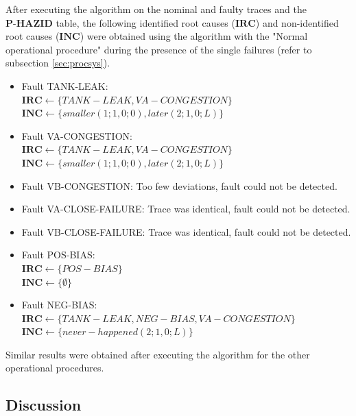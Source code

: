 \documentclass[conference]{IEEEtran}
\begin{document}
After executing the algorithm on the nominal and faulty traces and the $\textbf{P-HAZID}$ table, the following identified root causes ($\mathbf{IRC}$) and non-identified root causes ($\mathbf{INC}$) were obtained using the algorithm with the "Normal operational procedure" during the presence of the single failures (refer to subsection \ref{sec:procsys}).

\begin{itemize}

\item Fault TANK-LEAK: \\ $\mathbf{IRC} \leftarrow \{ TANK-LEAK,VA-CONGESTION \} $\\ $\mathbf{INC} \leftarrow \{ smaller(1;1,0;0), later(2;1,0;L) \}$

\item Fault VA-CONGESTION: \\ $\mathbf{IRC} \leftarrow \{ TANK-LEAK,VA-CONGESTION \}$\\ $\mathbf{INC} \leftarrow \{ smaller(1;1,0;0), later(2;1,0;L) \}$

\item Fault VB-CONGESTION: Too few deviations, fault could not be detected.

\item Fault VA-CLOSE-FAILURE: Trace was identical, fault could not be detected.

\item Fault VB-CLOSE-FAILURE: Trace was identical, fault could not be detected.

\item Fault POS-BIAS: \\ $\mathbf{IRC} \leftarrow \{ POS-BIAS \}$ \\ $\mathbf{INC} \leftarrow \{ \emptyset \} $

\item Fault NEG-BIAS: \\ $\mathbf{IRC} \leftarrow \{ TANK-LEAK, NEG-BIAS, VA-CONGESTION \}$ \\ $\mathbf{INC} \leftarrow \{ never-happened(2;1,0;L) \}$

\end{itemize}

Similar results were obtained after executing the algorithm for the other operational procedures.

\subsection{Discussion}
\label{sec:discussion}
\end{document}
